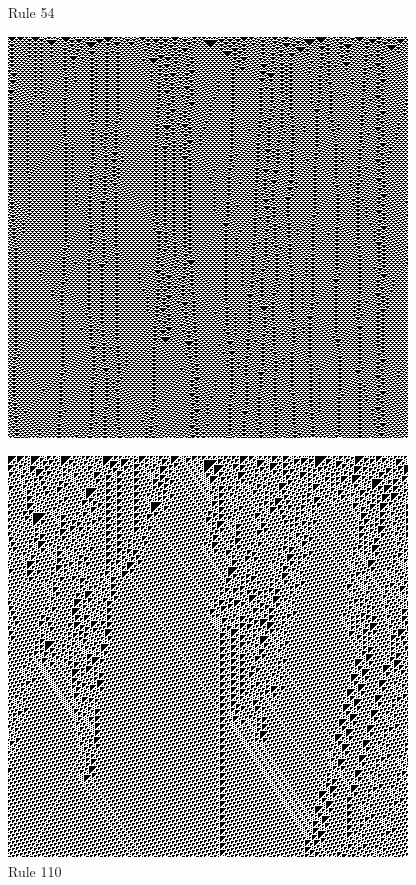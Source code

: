 \documentclass{article}
\begin{document}
\begin{figure}[H]
  \begin{center}
    \begin{minipage}{0.48\textwidth}
      \caption{Rule 54}
      \label{fig:figure1}
      \centering
      \includegraphics[scale=.5]{54.png}
    \end{minipage}
    \begin{minipage}{0.48\textwidth}
      \caption{Rule 110}
      \label{fig:figure2}
      \centering
      \includegraphics[scale=.5]{110.png}
    \end{minipage}
  \end{center}
\end{figure}
\end{document}
